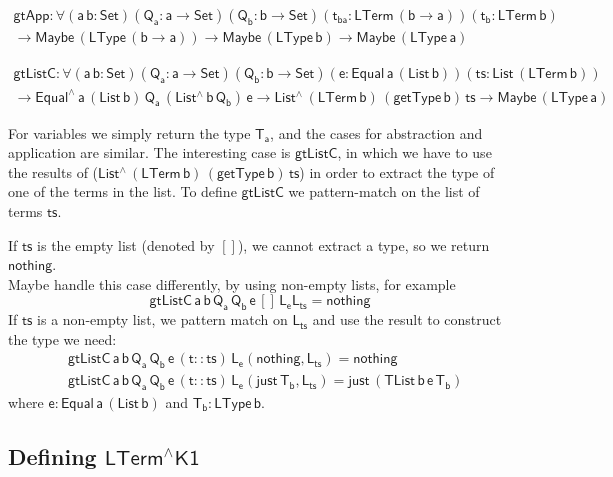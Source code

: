 \documentclass[9pt]{entcs}
\begin{document}
\begin{multline*}
    \mathsf{gtApp : \forall (a \, b : Set) (Q_a : a \to Set) (Q_b : b \to Set) 
      (t_{ba} : LTerm\, (b \to a)) (t_b : LTerm\, b)} \\ 
    \mathsf{
      \to Maybe\, (LType\, (b \to a))
      \to Maybe\, (LType\, b)
      \to Maybe\, (LType\, a)
    }
\end{multline*}


\begin{multline*}
    \mathsf{gtListC : \forall (a \, b : Set) (Q_a : a \to Set) (Q_b : b \to Set) 
      (e : Equal\, a\, (List\, b)) (ts : List\, (LTerm\, b))} \\ 
    \mathsf{
      \to Equal^{\wedge}\, a\, (List\,b) \, Q_a\, (List^{\wedge}\, b\, Q_b)\, e
      \to List^{\wedge}\, (LTerm\, b)\, (getType\, b)\, ts
      \to Maybe\, (LType\, a)
    }
\end{multline*}


For variables we simply return the type $\mathsf{T_a}$, 
and the cases for abstraction and application are similar.
The interesting case is $\mathsf{gtListC}$, in which we have to use 
the results of ($\mathsf{List^{\wedge}\, (LTerm\, b)\, (getType\, b)\, ts}$)
in order to extract the type of one of the terms in the list. 
To define $\mathsf{gtListC}$ we pattern-match on the list of terms $\mathsf{ts}$.  

If $\mathsf{ts}$ is the empty list (denoted by $\mathsf{[]}$), we cannot extract a type, 
so we return $\mathsf{nothing}$. \\
{\color{red} Maybe handle this case differently, by using non-empty lists, for example}
\[
  \mathsf{gtListC\, a\, b\, Q_a\, Q_b\, e\, [] \, L_e L_{ts} = nothing}
\]
If $\mathsf{ts}$ is a non-empty list, we pattern match on $\mathsf{L_{ts}}$ and use the result
to construct the type we need:
\begin{align*}
  &\mathsf{gtListC\, a\, b\, Q_a\, Q_b\, e\, (t :: ts) \, L_e (nothing , L_{ts}) = nothing} \\
  &\mathsf{gtListC\, a\, b\, Q_a\, Q_b\, e\, (t :: ts) \, L_e (just\, T_b , L_{ts}) = just \, (TList\, b\, e\, T_b)}
\end{align*}
where $\mathsf{e : Equal\, a\, (List\,b)}$ and $\mathsf{T_b : LType\, b}$. 

\subsection{Defining $\mathsf{LTerm^{\wedge}K1}$}
\end{document}
